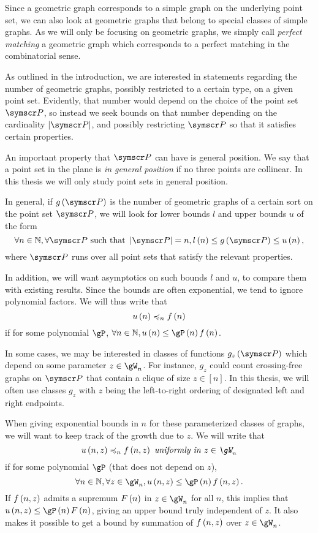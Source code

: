 Since a geometric graph corresponds to a simple graph on the underlying point set,
we can also look at geometric graphs that belong to special classes of simple graphs.
As we will only be focusing on geometric graphs, we simply call
\emph{perfect matching}
a geometric graph which corresponds to a perfect matching in the combinatorial sense.

As outlined in the introduction, we are interested in statements regarding the number
of geometric graphs, possibly restricted to a certain type, on a given point set.
Evidently, that number would depend on the choice of the point set $\pointset P$, so instead we seek
bounds on that number depending on the cardinality $\Cardinality {\pointset P}$, and possibly
restricting $\pointset P$ so that it satisfies certain properties.

An important property that $\pointset P$ can have is general position. We say that 
a point set in the plane is \emph{in general position} if no three points are collinear.
In this thesis we will only study point sets in general position.

In general, if $g\of {\pointset P}$ is the number of geometric graphs of a certain sort on the point
set $\pointset P$, we will look for lower bounds $l$ and upper bounds $u$ of the form\[
\forall n\in \N, \forall \pointset P \text{ such that } \Cardinality {\pointset P} = n,
l \of n \leq g \of {\pointset P} \leq u \of n \text,\]
where $\pointset P$ runs over all point sets that satisfy the relevant properties.

In addition, we will want asymptotics on such bounds $l$ and $u$, to compare them with
existing results. Since the bounds are often exponential, we tend to ignore polynomial
factors. We will thus write that\[
u \left(n\right) \preccurlyeq_n f \left(n\right)
\]
if for some polynomial $\gP$, $\forall n\in \N, u\of n \leq \gP\of n f \of n$.

In some cases, we may be interested in classes of functions $g_z\of{\pointset P}$
which depend on some parameter $z\in\gW_n$.
For instance, $g_z$ could count crossing-free graphs on $\pointset P$ that contain a clique of size
$z\in [n]$.
In this thesis, we will often use classes $g_z$ with $z$ being the left-to-right ordering
of designated left and right endpoints.

When giving exponential bounds in $n$ for these parameterized classes of graphs, we will want to keep
track of the growth due to $z$. We will write that\[
u \of {n,z} \preccurlyeq_n f \of {n,z} \text{ \emph{uniformly in $z\in\gW_n$}}\]
if for some polynomial $\gP$ (that does not depend on $z$),
\[\forall n\in \N,\forall z \in \gW_n, u\of {n,z} \leq \gP\of n f \of {n,z}\text.\]
If $f \left(n,z\right)$ admits a supremum $F \left(n\right)$ in $z\in\gW_n$ for all $n$, this implies
that $u\of {n,z} \leq \gP\of n F \of{n}$, giving an upper bound truly independent of $z$.
It also makes it possible to get a bound by summation of $f \left(n,z\right)$ over $z\in\gW_n$.

